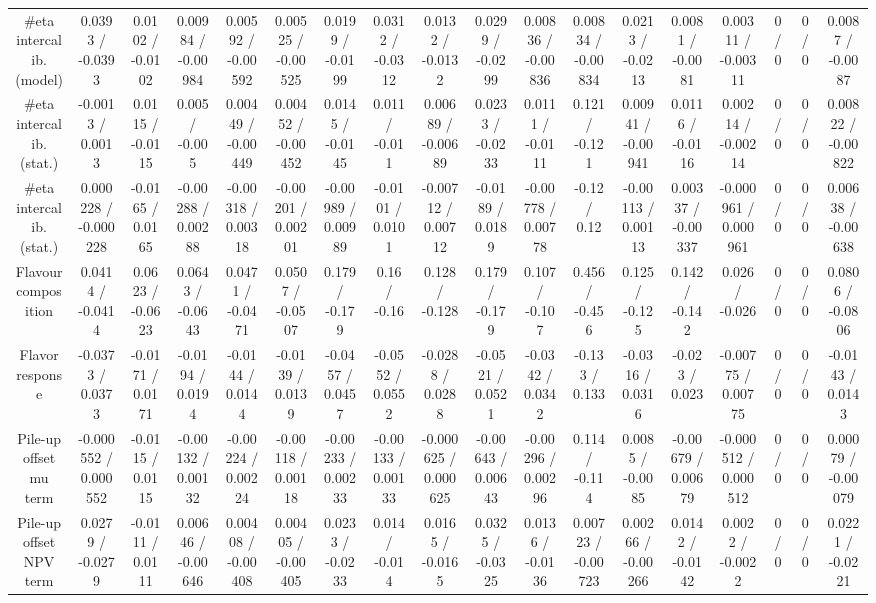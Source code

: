 \documentclass[10pt]{article}
\begin{document}
\begin{table}[htbp]
\begin{center}
\begin{tabular}{|c|c|c|c|c|c|c|c|c|c|c|c|c|c|c|c|c|c|}
  #eta intercalib. (model) & 0.0393 / -0.0393 & 0.0102 / -0.0102 & 0.00984 / -0.00984 & 0.00592 / -0.00592 & 0.00525 / -0.00525 & 0.0199 / -0.0199 & 0.0312 / -0.0312 & 0.0132 / -0.0132 & 0.0299 / -0.0299 & 0.00836 / -0.00836 & 0.00834 / -0.00834 & 0.0213 / -0.0213 & 0.0081 / -0.0081 & 0.00311 / -0.00311 & 0 / 0 & 0 / 0 & 0.0087 / -0.0087 \\ 
  #eta intercalib. (stat.) & -0.0013 / 0.0013 & 0.0115 / -0.0115 & 0.005 / -0.005 & 0.00449 / -0.00449 & 0.00452 / -0.00452 & 0.0145 / -0.0145 & 0.011 / -0.011 & 0.00689 / -0.00689 & 0.0233 / -0.0233 & 0.0111 / -0.0111 & 0.121 / -0.121 & 0.00941 / -0.00941 & 0.0116 / -0.0116 & 0.00214 / -0.00214 & 0 / 0 & 0 / 0 & 0.00822 / -0.00822 \\ 
  #eta intercalib. (stat.) & 0.000228 / -0.000228 & -0.0165 / 0.0165 & -0.00288 / 0.00288 & -0.00318 / 0.00318 & -0.00201 / 0.00201 & -0.00989 / 0.00989 & -0.0101 / 0.0101 & -0.00712 / 0.00712 & -0.0189 / 0.0189 & -0.00778 / 0.00778 & -0.12 / 0.12 & -0.00113 / 0.00113 & 0.00337 / -0.00337 & -0.000961 / 0.000961 & 0 / 0 & 0 / 0 & 0.00638 / -0.00638 \\ 
  Flavour composition & 0.0414 / -0.0414 & 0.0623 / -0.0623 & 0.0643 / -0.0643 & 0.0471 / -0.0471 & 0.0507 / -0.0507 & 0.179 / -0.179 & 0.16 / -0.16 & 0.128 / -0.128 & 0.179 / -0.179 & 0.107 / -0.107 & 0.456 / -0.456 & 0.125 / -0.125 & 0.142 / -0.142 & 0.026 / -0.026 & 0 / 0 & 0 / 0 & 0.0806 / -0.0806 \\ 
  Flavor response & -0.0373 / 0.0373 & -0.0171 / 0.0171 & -0.0194 / 0.0194 & -0.0144 / 0.0144 & -0.0139 / 0.0139 & -0.0457 / 0.0457 & -0.0552 / 0.0552 & -0.0288 / 0.0288 & -0.0521 / 0.0521 & -0.0342 / 0.0342 & -0.133 / 0.133 & -0.0316 / 0.0316 & -0.023 / 0.023 & -0.00775 / 0.00775 & 0 / 0 & 0 / 0 & -0.0143 / 0.0143 \\ 
  Pile-up offset mu term & -0.000552 / 0.000552 & -0.0115 / 0.0115 & -0.00132 / 0.00132 & -0.00224 / 0.00224 & -0.00118 / 0.00118 & -0.00233 / 0.00233 & -0.00133 / 0.00133 & -0.000625 / 0.000625 & -0.00643 / 0.00643 & -0.00296 / 0.00296 & 0.114 / -0.114 & 0.0085 / -0.0085 & -0.00679 / 0.00679 & -0.000512 / 0.000512 & 0 / 0 & 0 / 0 & 0.00079 / -0.00079 \\ 
  Pile-up offset NPV term & 0.0279 / -0.0279 & -0.0111 / 0.0111 & 0.00646 / -0.00646 & 0.00408 / -0.00408 & 0.00405 / -0.00405 & 0.0233 / -0.0233 & 0.014 / -0.014 & 0.0165 / -0.0165 & 0.0325 / -0.0325 & 0.0136 / -0.0136 & 0.00723 / -0.00723 & 0.00266 / -0.00266 & 0.0142 / -0.0142 & 0.0022 / -0.0022 & 0 / 0 & 0 / 0 & 0.0221 / -0.0221 \\ 

\end{tabular}
\end{center}
\end{table}
\end{document}
